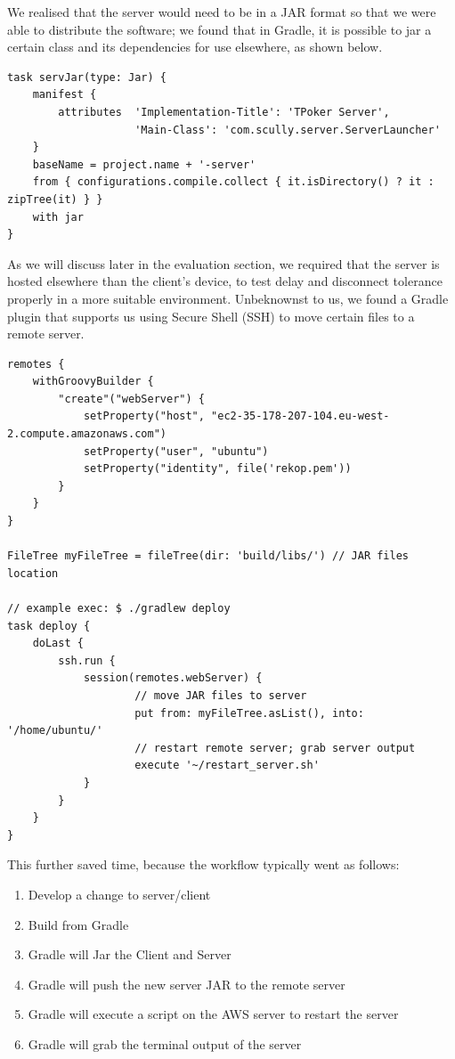 \documentclass[11pt]{article}
\begin{document}
We realised that the server would need to be in a JAR format so that we were able to distribute the software; we found that in Gradle, it is possible to jar a certain class and its dependencies for use elsewhere, as shown below.

\begin{lstlisting}
task servJar(type: Jar) {
    manifest {
        attributes 	'Implementation-Title': 'TPoker Server',
					'Main-Class': 'com.scully.server.ServerLauncher'
    }
    baseName = project.name + '-server'
    from { configurations.compile.collect { it.isDirectory() ? it : zipTree(it) } }
    with jar
}
\end{lstlisting}


As we will discuss later in the evaluation section, we required that the server is hosted elsewhere than the client's device, to test delay and disconnect tolerance properly in a more suitable environment. Unbeknownst to us, we found a Gradle plugin that supports us using Secure Shell (SSH) to move certain files to a remote server. \\

\begin{lstlisting} 
remotes {
    withGroovyBuilder {
        "create"("webServer") {
            setProperty("host", "ec2-35-178-207-104.eu-west-2.compute.amazonaws.com")
            setProperty("user", "ubuntu")
            setProperty("identity", file('rekop.pem'))
        }
    }
}

FileTree myFileTree = fileTree(dir: 'build/libs/') // JAR files location

// example exec: $ ./gradlew deploy
task deploy {
    doLast {
        ssh.run {
            session(remotes.webServer) {
					// move JAR files to server
                	put from: myFileTree.asList(), into: '/home/ubuntu/' 
                	// restart remote server; grab server output
                	execute '~/restart_server.sh' 
            }
        }
    }
}
\end{lstlisting}

This further saved time, because the workflow typically went as follows: \\

\begin{enumerate}
	\item Develop a change to server/client
	\item Build from Gradle
	\item Gradle will Jar the Client and Server
	\item Gradle will push the new server JAR to the remote server
	\item Gradle will execute a script on the AWS server to restart the server
	\item Gradle will grab the terminal output of the server \\
\end{enumerate}
\end{document}
